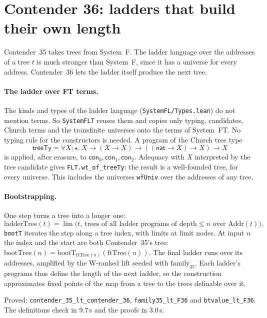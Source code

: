 \documentclass[11pt]{article}
\theoremstyle{definition}
\theoremstyle{remark}
\newcommand{\lean}[1]{\texttt{#1}}
\begin{document}
\section{Contender 36: ladders that build their own length}

Contender~35 takes trees from System~F. The ladder language over the
addresses of a tree $t$ is much stronger than System~F, since it has a universe
for every address. Contender~36 lets the ladder itself produce the next tree.

\paragraph{The ladder over FT terms.} The kinds and types of the ladder
language (\lean{SystemFL/Types.lean}) do not mention terms. So
\lean{SystemFLT} reuses them and copies only typing, candidates, Church terms
and the transfinite universes onto the terms of System~FT. No typing rule
for the constructors is needed. A program of the Church tree type
\[
\mathsf{treeTy}=\forall X{:}\star.\ X\to(X\to X)\to((\mathsf{nat}\to X)\to X)\to X
\]
is applied, after erasure, to $\mathsf{con}_0,\mathsf{con}_1,\mathsf{con}_2$.
Adequacy with $X$ interpreted by the tree candidate gives
\lean{FLT.wt\_of\_treeTy}: the result is a well-founded tree, for every
universe. This includes the universes \lean{wfUniv} over the addresses of any
tree.

\paragraph{Bootstrapping.} One step turns a tree into a longer one:
\[
\mathrm{ladderTree}(t)=\lim\bigl(t,\ \text{trees of all ladder programs of
depth}\le n\text{ over }\mathrm{Addr}(t)\bigr).
\]
\lean{bootT} iterates the step along a tree index, with limits at limit
nodes. At input $n$ the index and the start are both Contender~35's tree:
$\mathrm{bootTree}(n)=\mathrm{bootT}_{\mathrm{ftTree}(n)}(\mathrm{ftTree}(n))$.
The final ladder runs over its addresses, amplified by the W-ranked lift seeded
with $\mathrm{family}_{35}$. Each ladder's programs thus define the length of
the next ladder, so the construction approximates fixed points of the map
from a tree to the trees definable over it.

Proved: \lean{contender\_35\_lt\_\allowbreak contender\_36},
\lean{family35\_lt\_F36} and \lean{btvalue\_lt\_F36}. The definitions check in
9.7\,s and the proofs in 3.0\,s.
\end{document}
